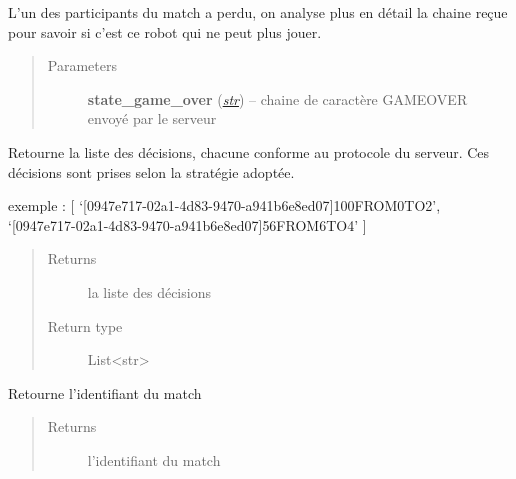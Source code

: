 \documentclass[letterpaper,10pt,english]{sphinxmanual}
\begin{document}
\begin{fulllineitems}
\begin{fulllineitems}
\end{fulllineitems}


\begin{fulllineitems}
\label{index:Robot.Robot.game_over}
L'un des participants du match a perdu, on analyse plus en détail la chaine reçue pour savoir si c'est ce robot qui ne peut plus jouer.
\begin{quote}\begin{description}
\item[{Parameters}] \leavevmode
\textbf{state\_game\_over} (\href{http://docs.python.org/library/functions.html\#str}{\emph{str}}) -- chaine de caractère GAMEOVER envoyé par le serveur

\end{description}\end{quote}

\end{fulllineitems}


\begin{fulllineitems}
\label{index:Robot.Robot.getDecisions}
Retourne la liste des décisions, chacune conforme au protocole du serveur. 
Ces décisions sont prises selon la stratégie adoptée.

exemple : {[} `{[}0947e717-02a1-4d83-9470-a941b6e8ed07{]}100FROM0TO2', `{[}0947e717-02a1-4d83-9470-a941b6e8ed07{]}56FROM6TO4' {]}
\begin{quote}\begin{description}
\item[{Returns}] \leavevmode
la liste des décisions

\item[{Return type}] \leavevmode
List\textless{}str\textgreater{}

\end{description}\end{quote}

\end{fulllineitems}


\begin{fulllineitems}
\label{index:Robot.Robot.getIdMatch}
Retourne l'identifiant du match
\begin{quote}\begin{description}
\item[{Returns}] \leavevmode
l'identifiant du match


\end{description}
\end{quote}
\end{fulllineitems}
\end{fulllineitems}
\end{document}
